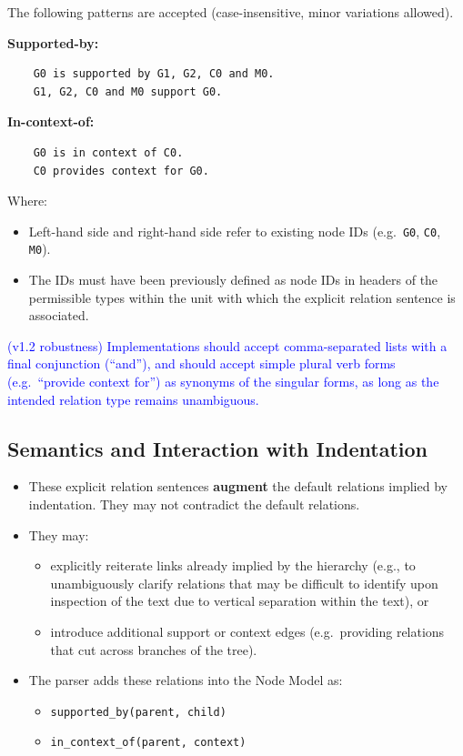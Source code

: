 \documentclass[11pt,twoside,a4paper]{article}
\begin{document}
The following patterns are accepted (case-insensitive, minor variations allowed).

\textbf{Supported-by:}
\begin{verbatim}
    G0 is supported by G1, G2, C0 and M0.
    G1, G2, C0 and M0 support G0.
\end{verbatim}

\textbf{In-context-of:}
\begin{verbatim}
    G0 is in context of C0.
    C0 provides context for G0.
\end{verbatim}

Where:
\begin{itemize}[leftmargin=2em]
  \item Left-hand side and right-hand side refer to existing node IDs (e.g.\ \texttt{G0}, \texttt{C0}, \texttt{M0}).
  \item The IDs must have been previously defined as node IDs in headers of the permissible types within the unit with which the explicit relation sentence is associated.
\end{itemize}

\textcolor{blue}{(v1.2 robustness) Implementations should accept comma-separated lists with a final conjunction (``and''), and should accept simple plural verb forms (e.g.\ ``provide context for'') as synonyms of the singular forms, as long as the intended relation type remains unambiguous.}

\subsection{Semantics and Interaction with Indentation}

\begin{itemize}[leftmargin=2em]
  \item These explicit relation sentences \textbf{augment} the default relations implied by indentation. They may not contradict the default relations.
  \item They may:
  \begin{itemize}[leftmargin=1.5em]
    \item explicitly reiterate links already implied by the hierarchy (e.g., to unambiguously clarify relations that may be difficult to identify upon inspection of the text due to vertical separation within the text), or
    \item introduce additional support or context edges (e.g.\ providing relations that cut across branches of the tree).
  \end{itemize}
  \item The parser adds these relations into the Node Model as:
  \begin{itemize}[leftmargin=1.5em]
    \item \texttt{supported\_by(parent, child)}
    \item \texttt{in\_context\_of(parent, context)}
  \end{itemize}
\end{itemize}
\end{document}
